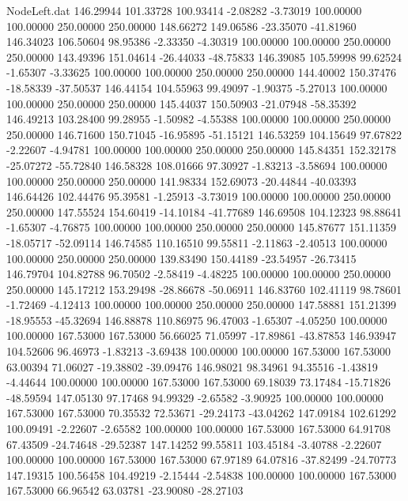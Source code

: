 \begin{filecontents}{NodeLeft.dat}
 146.29944  101.33728  100.93414    -2.08282   -3.73019  100.00000  100.00000  250.00000  250.00000  148.66272  149.06586  -23.35070  -41.81960
 146.34023  106.50604   98.95386    -2.33350   -4.30319  100.00000  100.00000  250.00000  250.00000  143.49396  151.04614  -26.44033  -48.75833
 146.39085  105.59998   99.62524    -1.65307   -3.33625  100.00000  100.00000  250.00000  250.00000  144.40002  150.37476  -18.58339  -37.50537
 146.44154  104.55963   99.49097    -1.90375   -5.27013  100.00000  100.00000  250.00000  250.00000  145.44037  150.50903  -21.07948  -58.35392
 146.49213  103.28400   99.28955    -1.50982   -4.55388  100.00000  100.00000  250.00000  250.00000  146.71600  150.71045  -16.95895  -51.15121
 146.53259  104.15649   97.67822    -2.22607   -4.94781  100.00000  100.00000  250.00000  250.00000  145.84351  152.32178  -25.07272  -55.72840
 146.58328  108.01666   97.30927    -1.83213   -3.58694  100.00000  100.00000  250.00000  250.00000  141.98334  152.69073  -20.44844  -40.03393
 146.64426  102.44476   95.39581    -1.25913   -3.73019  100.00000  100.00000  250.00000  250.00000  147.55524  154.60419  -14.10184  -41.77689
 146.69508  104.12323   98.88641    -1.65307   -4.76875  100.00000  100.00000  250.00000  250.00000  145.87677  151.11359  -18.05717  -52.09114
 146.74585  110.16510   99.55811    -2.11863   -2.40513  100.00000  100.00000  250.00000  250.00000  139.83490  150.44189  -23.54957  -26.73415
 146.79704  104.82788   96.70502    -2.58419   -4.48225  100.00000  100.00000  250.00000  250.00000  145.17212  153.29498  -28.86678  -50.06911
 146.83760  102.41119   98.78601    -1.72469   -4.12413  100.00000  100.00000  250.00000  250.00000  147.58881  151.21399  -18.95553  -45.32694
 146.88878  110.86975   96.47003    -1.65307   -4.05250  100.00000  100.00000  167.53000  167.53000   56.66025   71.05997  -17.89861  -43.87853
 146.93947  104.52606   96.46973    -1.83213   -3.69438  100.00000  100.00000  167.53000  167.53000   63.00394   71.06027  -19.38802  -39.09476
 146.98021   98.34961   94.35516    -1.43819   -4.44644  100.00000  100.00000  167.53000  167.53000   69.18039   73.17484  -15.71826  -48.59594
 147.05130   97.17468   94.99329    -2.65582   -3.90925  100.00000  100.00000  167.53000  167.53000   70.35532   72.53671  -29.24173  -43.04262
 147.09184  102.61292  100.09491    -2.22607   -2.65582  100.00000  100.00000  167.53000  167.53000   64.91708   67.43509  -24.74648  -29.52387
 147.14252   99.55811  103.45184    -3.40788   -2.22607  100.00000  100.00000  167.53000  167.53000   67.97189   64.07816  -37.82499  -24.70773
 147.19315  100.56458  104.49219    -2.15444   -2.54838  100.00000  100.00000  167.53000  167.53000   66.96542   63.03781  -23.90080  -28.27103

\end{filecontents}
